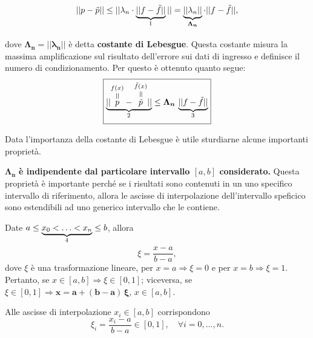 \begin{equation*}
	||p-\Tilde{p}||\leq ||\lambda_n\cdot\underbrace{||f-\Tilde{f}||}_{\footnotemark}||=\underbrace{||\lambda_n||}_{\boldsymbol{\Lambda_n}}\cdot||f-\Tilde{f}||,
\end{equation*}

\noindent dove $\boldsymbol{\Lambda_n=||\lambda_n||}$ è detta \textbf{costante di Lebesgue}. Questa costante misura la massima amplificazione sul risultato dell'errore sui dati di ingresso e definisce il numero di condizionamento. Per questo è ottenuto quanto segue:
\begin{equation}\label{eq:maggPertDiffPTildeP}
    \boxed{\underbrace{||\equaltoup{p}{f(x)}-\equaltoup{\Tilde{p}}{\Tilde{f}(x)}||}_{\footnotemark}\leq\boldsymbol{\Lambda_n}\,\underbrace{||f-\Tilde{f}||}_{\footnotemark}}
\end{equation}

\addtocounter{footnote}{-1}


Data l'importanza della costante di Lebesgue è utile sturdiarne alcune importanti proprietà.

\noindent$\boldsymbol{\Lambda_n}$ \textbf{è indipendente dal particolare intervallo $[a,b]$ considerato.} Questa proprietà è importante perché se i risultati sono contenuti in un uno specifico intervallo di riferimento, allora le ascisse di interpolazione dell'intervallo speficico sono estendibili ad uno generico intervallo che le contiene.

Date $a\leq\underbrace{x_0<\hdots<x_n}_{\footnotemark}\leq b$, allora
\begin{equation}\label{eq:xi}
    \xi=\frac{x-a}{b-a}, 
\end{equation}
dove $\xi$ è una trasformazione lineare, per $x=a\Rightarrow\xi = 0$ e per $x=b\Rightarrow\xi = 1$. Pertanto, se $x\in [a,b] \Rightarrow\xi\in [0,1]$; viceversa, se $\xi\in [0,1]\Rightarrow \boldsymbol{x=a+(b-a)\,\xi},\, x\in [a,b]$.


Alle ascisse di interpolazione $x_i\in [a,b]$ corrispondono
\begin{equation}\label{eq:xii}
    \xi_i=\frac{x_i-a}{b-a}\in [0,1],\quad \forall i=0,\hdots,n.
\end{equation}

